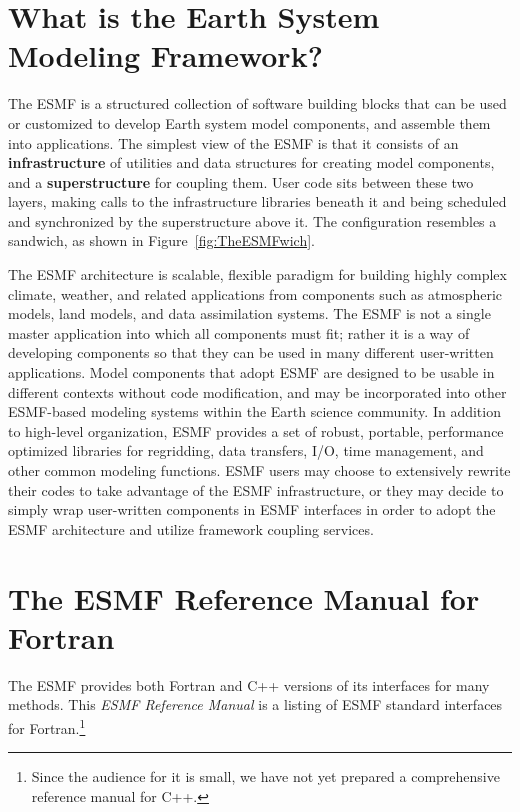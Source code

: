 
\section{What is the Earth System Modeling Framework?}

The ESMF is a structured collection of software building blocks that 
can be used or customized to develop 
Earth system model components, and assemble them into applications.  
The simplest view of the ESMF is that it consists of an
{\bf infrastructure} of utilities and data structures for creating 
model components, and a {\bf superstructure} for coupling them.  
User code sits between these two layers, making calls to the infrastructure
libraries beneath it and being scheduled and synchronized by the 
superstructure above it.  The configuration resembles a sandwich, as
shown in Figure~\ref{fig:TheESMFwich}.

The ESMF architecture is scalable, flexible paradigm for building highly 
complex climate, weather, and related applications from components such
as atmospheric models, land models, and data assimilation systems.  The 
ESMF is not a single master application into which all components must fit; 
rather it is a way of developing components so that they can be used 
in many different user-written applications.  Model components that adopt 
ESMF are designed to be usable in different contexts without code 
modification, and may be
incorporated into other ESMF-based modeling systems within the Earth 
science community.  In addition to high-level organization, ESMF provides 
a set of robust, portable, performance optimized libraries for regridding, 
data transfers, I/O, time management, and other common modeling functions.  
ESMF users may choose to extensively rewrite their codes to take advantage 
of the ESMF infrastructure, or they may decide to simply wrap user-written 
components in ESMF interfaces in order to adopt the ESMF architecture and 
utilize framework coupling services.

\section{The ESMF Reference Manual for Fortran}

The ESMF provides both Fortran and C++ versions of its interfaces
for many methods.  This {\it ESMF Reference Manual} is a listing of 
ESMF standard interfaces for Fortran.\footnote{Since the audience for it is 
small, we have not yet prepared a comprehensive reference manual for C++.}  

